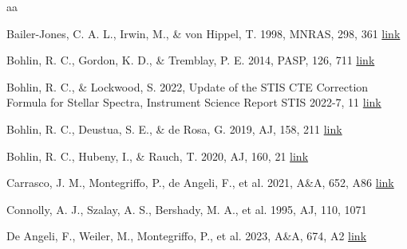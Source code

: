 \documentclass{aa}
\begin{document}
\begin{thebibliography}{aa}
\setlength{\itemsep}{0.15cm}


        
    Bailer-Jones, C. A. L., Irwin, M., \& von Hippel, T. 1998, MNRAS, 298, 361
    \href{https://academic.oup.com/mnras/article/298/2/361/1056578}{link}

    Bohlin, R. C., Gordon, K. D., \& Tremblay, P. E. 2014, PASP, 126, 711 \href{https://ui.adsabs.harvard.edu/abs/2014PASP..126..711B/abstract}{link}

    Bohlin, R. C., \& Lockwood, S. 2022, Update of the STIS CTE Correction  Formula for Stellar Spectra, Instrument Science Report STIS 2022-7, 11 \href{https://www.stsci.edu/files/live/sites/www/files/home/hst/instrumentation/stis/documentation/instrument-science-reports/_documents/2022_07.pdf}{link}
    
    Bohlin, R. C., Deustua, S. E., \& de Rosa, G. 2019, AJ, 158, 211 \href{https://ui.adsabs.harvard.edu/abs/2019AJ....158..211B/abstract}{link}
    
    Bohlin, R. C., Hubeny, I., \& Rauch, T. 2020, AJ, 160, 21 \href{https://ui.adsabs.harvard.edu/abs/2020AJ....160...21B/abstract}{link}

    Carrasco, J. M., Montegriffo, P., de Angeli, F., et al. 2021, A\&A, 652, A86
    \href{https://ui.adsabs.harvard.edu/abs/2021A%26A...652A..86C/abstract}{link}

    Connolly, A. J., Szalay, A. S., Bershady, M. A., et al. 1995, AJ, 110, 1071
    
    De Angeli, F., Weiler, M., Montegriffo, P., et al. 2023, A\&A, 674, A2
    \href{https://www.aanda.org/articles/aa/abs/2023/06/aa43680-22/aa43680-22.html}{link}
    

\end{thebibliography}
\end{document}
